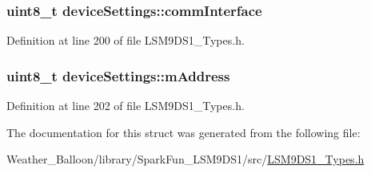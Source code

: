 \subsubsection[{\texorpdfstring{comm\+Interface}{commInterface}}]{\setlength{\rightskip}{0pt plus 5cm}uint8\+\_\+t device\+Settings\+::comm\+Interface}\hypertarget{structdevice_settings_a6512c63d06cce5f99760b1b3a6a4dfe9}{}\label{structdevice_settings_a6512c63d06cce5f99760b1b3a6a4dfe9}


Definition at line 200 of file L\+S\+M9\+D\+S1\+\_\+\+Types.\+h.

\subsubsection[{\texorpdfstring{m\+Address}{mAddress}}]{\setlength{\rightskip}{0pt plus 5cm}uint8\+\_\+t device\+Settings\+::m\+Address}\hypertarget{structdevice_settings_aec4e1d3e3f38b4e3e0f74f1640e16faa}{}\label{structdevice_settings_aec4e1d3e3f38b4e3e0f74f1640e16faa}


Definition at line 202 of file L\+S\+M9\+D\+S1\+\_\+\+Types.\+h.



The documentation for this struct was generated from the following file\+:\begin{DoxyCompactItemize}
\item 
Weather\+\_\+\+Balloon/library/\+Spark\+Fun\+\_\+\+L\+S\+M9\+D\+S1/src/\hyperlink{_l_s_m9_d_s1___types_8h}{L\+S\+M9\+D\+S1\+\_\+\+Types.\+h}\end{DoxyCompactItemize}

